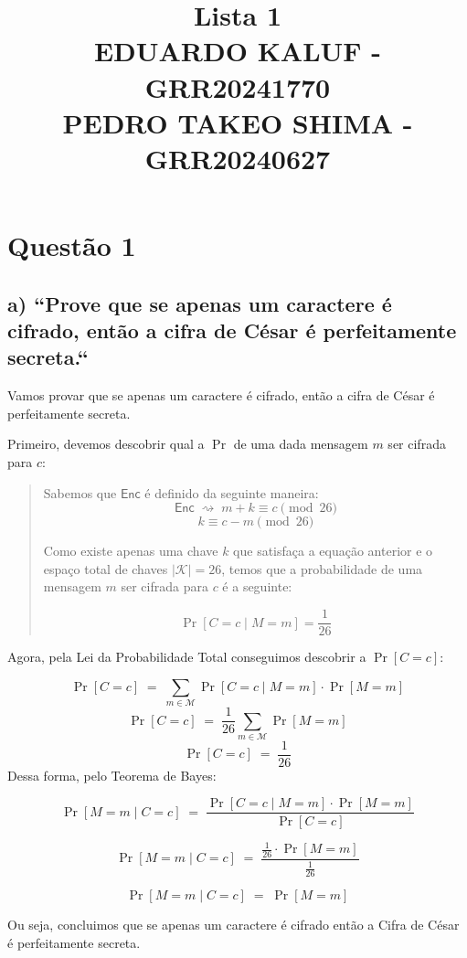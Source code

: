 \documentclass[11pt,a4paper]{article}
\title{Lista 1 \\ EDUARDO KALUF - GRR20241770 \\ PEDRO TAKEO SHIMA - GRR20240627}
\author{}
\date{}
\newcommand{\Enc}{\mathsf{Enc}}
\begin{document}
\maketitle

\section*{Questão 1}

\subsection*{a) ``Prove que se apenas um caractere é cifrado, então a cifra de César é perfeitamente secreta.``}

Vamos provar que se apenas um caractere é cifrado, então a cifra de César é perfeitamente secreta.

Primeiro, devemos descobrir qual a $\Pr$ de uma dada mensagem $m$ ser cifrada para $c$:

\begin{quote}
    Sabemos que ${\mathsf{Enc}}$ é definido da seguinte maneira:
    \[
    \Enc \;\rightsquigarrow\; m + k \equiv c \pmod{26}
    \]
    \[
    k \equiv c - m \pmod{26}
    \]

    Como existe apenas uma chave $k$ que satisfaça a equação anterior e o espaço total de chaves $|\mathcal{K}| = 26$, temos que a
    probabilidade de uma mensagem $m$ ser cifrada para $c$ é a seguinte:

    \[
    \Pr[C=c \mid M=m] = \frac{1}{26}
    \]
\end{quote}

Agora, pela Lei da Probabilidade Total conseguimos descobrir a ${\Pr[C=c]}$:

\[
\Pr[C=c] \;=\; \sum_{m \in \mathcal{M}} \Pr[C=c \mid M=m]\cdot \Pr[M=m]
\]
\[
\Pr[C=c] \;=\; \frac{1}{26}\sum_{m \in \mathcal{M}} \Pr[M=m]
\]
\[
\Pr[C=c] \;=\; \frac{1}{26}
\]
Dessa forma, pelo Teorema de Bayes:

\[
    \Pr[M=m \mid C=c] \;=\; \frac{\Pr[C=c \mid M=m]\cdot \Pr[M=m]}{\Pr[C=c]}
\]

\[
\Pr[M=m \mid C=c] \;=\; \frac{\frac{1}{26}\cdot \Pr[M=m]}{\frac{1}{26}}
\]

\[
\Pr[M=m \mid C=c] \;=\; \Pr[M=m]
\]

Ou seja, concluimos que se apenas um caractere é cifrado então a Cifra de César é perfeitamente secreta.
\end{document}
